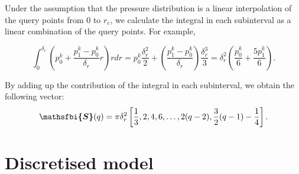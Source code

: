 \documentclass{jfm}
\newcommand{\bfjfm}[1]{\bm{\mathsfbi{#1}}}
\begin{document}
Under the assumption that the pressure distribution is a linear interpolation of the query points from $0$ to $r_c$, we calculate the integral in each subinterval as a linear combination of the query points. For example,

\begin{equation}
    \int_0^{\delta_r} \left(p^k_0 + \frac{p^k_1 - p^k_0}{\delta_r} r\right) r dr
    = p^k_0 \frac{\delta_r^2}{2} + \left(\frac{p^k_1 - p^k_0}{\delta_r}\right) \frac{\delta_r^3}{3}
    =
    \delta_r^2 \left(\frac{p^k_0}{6} + \frac{5p^k_1}{6}\right).
\end{equation}

By adding up the contribution of the integral in each subinterval, we obtain the following vector:
\begin{equation}
    \bfjfm{S}(q) = \pi \delta_r^2\left[ \frac{1}{3}, 2, 4, 6, \dots, 2(q-2), \frac{3}{2}(q-1) - \frac{1}{4}\right].
\end{equation}

\section{Discretised model}\label{section:discrete_model_summary}
\end{document}
